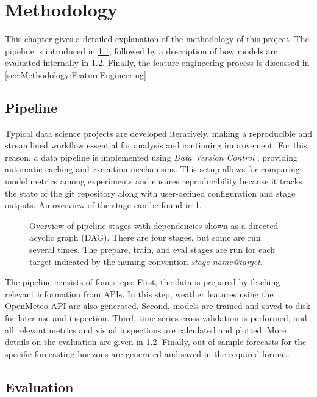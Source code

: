 \newpage
\section{Methodology}
\label{ch:Methodology}

This chapter gives a detailed explanation of the methodology of this project. The pipeline is introduced in \cref{sec:Methodology:Pipeline}, followed by a description of how models are evaluated internally in \cref{sec:Methodology:Evaluation}. Finally, the feature engineering process is discussed in \cref{sec:Methodology:FeatureEngineering}


\subsection{Pipeline}
\label{sec:Methodology:Pipeline}

Typical data science projects are developed iteratively, making a reproducible and streamlined workflow essential for analysis and continuing improvement. For this reason, a data pipeline is implemented using \textit{Data Version Control} \parencite{ruslan_kuprieiev_dvc_2024}, providing automatic caching and execution mechanisms. This setup allows for comparing model metrics among experiments and ensures reproducibility because it tracks the state of the git repository along with user-defined configuration and stage outputs. An overview of the stage can be found in \cref{fig:pipeline}.
\begin{figure}[htbp]
  \centering
  
  \caption{Overview of pipeline stages with dependencies shown as a directed acyclic graph (DAG). There are four stages, but some are run several times. The prepare, train, and eval stages are run for each target indicated by the naming convention \textit{stage-name@target}.} 
  \label{fig:pipeline}
\end{figure}
The pipeline consists of four steps: First, the data is prepared by fetching relevant information from APIs. In this step, weather features using the OpenMeteo API are also generated. Second, models are trained and saved to disk for later use and inspection. Third, time-series cross-validation is performed, and all relevant metrics and visual inspections are calculated and plotted. More details on the evaluation are given in \cref{sec:Methodology:Evaluation}. Finally, out-of-sample forecasts for the specific forecasting horizons are generated and saved in the required format.

\subsection{Evaluation}
\label{sec:Methodology:Evaluation}


